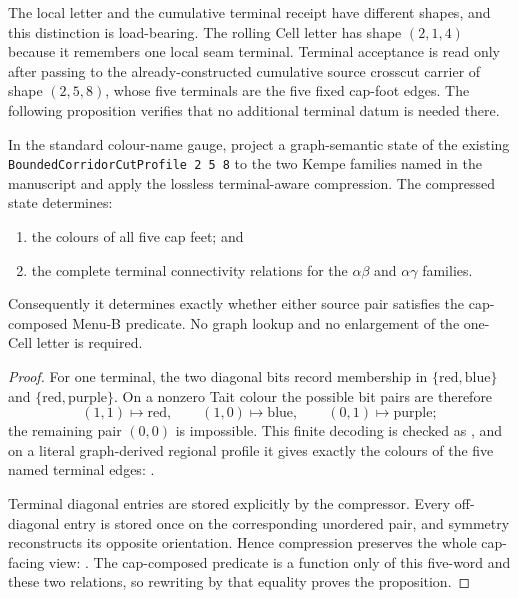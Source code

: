 The local letter and the cumulative terminal receipt have different shapes,
and this distinction is load-bearing.  The rolling Cell letter has shape
$(2,1,4)$ because it remembers one local seam terminal.  Terminal acceptance
is read only after passing to the already-constructed cumulative source
crosscut carrier of shape $(2,5,8)$, whose five terminals are the five fixed
cap-foot edges.  The following proposition verifies that no additional
terminal datum is needed there.

\begin{proposition}
\label{prop:five-terminal-source-cap-view}
In the standard colour-name gauge, project a graph-semantic state of the
existing \texttt{BoundedCorridorCutProfile 2 5 8} to the two Kempe families named in
the manuscript and apply the lossless terminal-aware compression.  The
compressed state determines:
\begin{enumerate}
\item the colours of all five cap feet; and
\item the complete terminal connectivity relations for the
      $\alpha\beta$ and $\alpha\gamma$ families.
\end{enumerate}
Consequently it determines exactly whether either source pair satisfies the
cap-composed Menu-B predicate.  No graph lookup and no enlargement of the
one-Cell letter is required.
\end{proposition}

\begin{proof}
For one terminal, the two diagonal bits record membership in
$\{\mathrm{red},\mathrm{blue}\}$ and
$\{\mathrm{red},\mathrm{purple}\}$.  On a nonzero Tait colour the possible
bit pairs are therefore
\[
 (1,1)\mapsto\mathrm{red},\qquad
 (1,0)\mapsto\mathrm{blue},\qquad
 (0,1)\mapsto\mathrm{purple};
\]
the remaining pair $(0,0)$ is impossible.  This finite decoding is checked
as
,
and on a literal graph-derived regional profile it gives exactly the colours
of the five named terminal edges:
.

Terminal diagonal entries are stored explicitly by the compressor.  Every
off-diagonal entry is stored once on the corresponding unordered pair, and
symmetry reconstructs its opposite orientation.  Hence compression preserves
the whole cap-facing view:
.
The cap-composed predicate is a function only of this five-word and these two
relations, so rewriting by that equality proves the proposition.
\end{proof}

